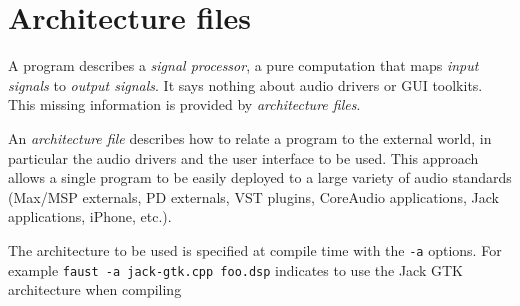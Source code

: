 \chapter{Architecture files} \label{sec:audio}

A \faust program describes a \emph{signal processor}, a pure computation that maps \emph{input signals} to \emph{output signals}. It says nothing about audio drivers or GUI toolkits. This missing information is provided by \emph{architecture files}. 



An \emph{architecture file} describes how to relate a \faust program to the external world, in particular the audio drivers and the user interface to be used. This approach allows a single \faust program to be easily deployed to a large variety of audio standards (Max/MSP externals, PD externals, VST plugins, CoreAudio applications, Jack applications, iPhone, etc.). 

The architecture to be used is specified at compile time with the \lstinline'-a' options. For example
\lstinline'faust -a jack-gtk.cpp foo.dsp' indicates to use the Jack GTK architecture when compiling 

